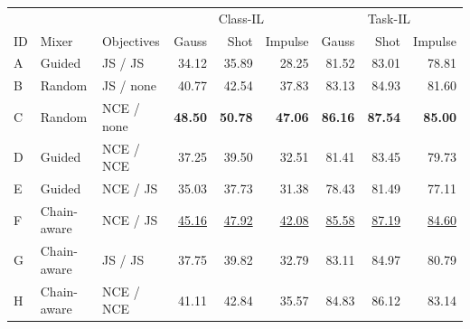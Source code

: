 \begin{center}
\begin{minipage}{\textwidth}
\centering\small
\setlength{\tabcolsep}{6pt}
\begin{tabular}{lllrrrrrr}
\toprule
 &  &  & \multicolumn{3}{c}{Class-IL} & \multicolumn{3}{c}{Task-IL} \\
ID & Mixer & Objectives & Gauss & Shot & Impulse & Gauss & Shot & Impulse \\
\midrule
A & Guided & JS / JS & 34.12 & 35.89 & 28.25 & 81.52 & 83.01 & 78.81 \\
B & Random & JS / none & 40.77 & 42.54 & 37.83 & 83.13 & 84.93 & 81.60 \\
C & Random & NCE / none & \textbf{48.50} & \textbf{50.78} & \textbf{47.06} & \textbf{86.16} & \textbf{87.54} & \textbf{85.00} \\
D & Guided & NCE / NCE & 37.25 & 39.50 & 32.51 & 81.41 & 83.45 & 79.73 \\
E & Guided & NCE / JS & 35.03 & 37.73 & 31.38 & 78.43 & 81.49 & 77.11 \\
\rowcolor{ourrow} F & Chain-aware & NCE / JS & \underline{45.16} & \underline{47.92} & \underline{42.08} & \underline{85.58} & \underline{87.19} & \underline{84.60} \\
G & Chain-aware & JS / JS & 37.75 & 39.82 & 32.79 & 83.11 & 84.97 & 80.79 \\
H & Chain-aware & NCE / NCE & 41.11 & 42.84 & 35.57 & 84.83 & 86.12 & 83.14 \\
\bottomrule
\end{tabular}
\end{minipage}
\end{center}
